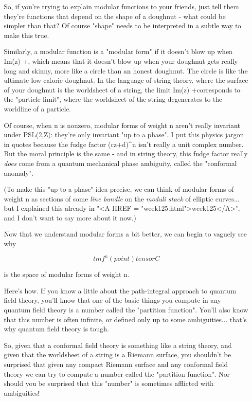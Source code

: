 So, if you're trying to explain modular functions to your friends,
just tell them they're functions that depend on the shape of a 
doughnut - what could be simpler than that?  Of course "shape"
needs to be interpreted in a subtle way to make this true.

Similarly, a modular function is a "modular form" if it doesn't 
blow up when Im(z) \to  +\infty , which means that it doesn't 
blow up when your doughnut gets really long and skinny, more
like a circle than an honest doughnut.   The 
circle is like the ultimate low-calorie doughnut.  In the language of 
string theory, where the surface of your doughnut is the worldsheet 
of a string, the limit Im(z) \to  +\infty  corresponds to 
the "particle limit", where 
the worldsheet of the string degenerates to the worldline of a particle.

Of course, when n is nonzero, modular forms of weight n aren't 
really invariant under PSL(2,Z): they're only invariant "up to 
a phase".  I put this physics jargon in quotes because the fudge 
factor (cz+d)^{n} isn't really a unit complex number.  But the moral 
principle is the same - and in string theory, this fudge factor 
really \emph{does} come from a quantum mechanical phase ambiguity, 
called the "conformal anomaly".  

(To make this "up to a phase" idea precise, we can think of 
modular forms of weight n as sections of some \emph{line bundle} 
on the \emph{moduli stack} of elliptic curves... but I explained this
already in "<A HREF = "week125.html">week125</A>", and I don't 
want to say more about it now.)

Now that we understand modular forms a bit better, we can
begin to vaguely see why 


$$

tmf^{n}(point) tensor C
$$
    
is the space of modular forms of weight n. 

Here's how.  If you know a little about the path-integral approach
to quantum field theory, you'll know that one of the basic things
you compute in any quantum field theory is a number called the
"partition function".  You'll also know that this number is often
infinite, or defined only up to some ambiguities... that's why
quantum field theory is tough.  

So, given that a conformal field theory is something like a string 
theory, and given that the worldsheet of a string is a Riemann 
surface, you shouldn't be surprised that given any compact Riemann 
surface and any conformal field theory we can try to compute a 
number called the "partition function".  Nor should you be surprised 
that this "number" is sometimes afflicted with ambiguities!  

